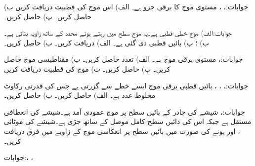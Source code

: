 جوابات:، ، 
مستوی موج کا برقی جزو  ہے۔ الف) اس موج کی قطبیت دریافت کریں ب)  حاصل کریں۔ پ)  حاصل کریں۔

جوابات:الف) موج خطی قطبی ہے۔یہ موج  سطح میں رہتے ہوئے  محدد کے ساتھ  زاویہ بناتی ہے۔\\
 ب) ؛ پ) 
بائیں قطبی  دی گئی ہے۔ الف)  دریافت کریں۔ ب)  حاصل کریں۔

جوابات:، 
مستوی برقی موج  ہے۔ الف) تعدد حاصل کریں۔ ب) مقناطیسی موج حاصل کریں۔ پ)  حاصل کریں۔ ت) موج کی قطبیت دریافت کریں

جوابات:، ، ، بائیں قطبی
برقی موج  ایسے خطے سے گزرتی ہے جس کی قدرتی رکاوٹ  مخلوط عدد ہے۔ الف)  حاصل کریں۔ ب)  حاصل کریں۔

جوابات:،
شیشے کی چادر کے بائیں سطح پر موج عمودی آمد ہے۔شیشے کی انعطافی مستقل  ہے جبکہ اس کی دائیں سطح کامل موصل کے ساتھ جڑی ہے۔شیشے کی موٹائی ،  اور  ہونے کی صورت میں بائیں سطح پر انعکاسی موج کے زاویے میں فرق دریافت کریں۔

جوابات:، ، 

